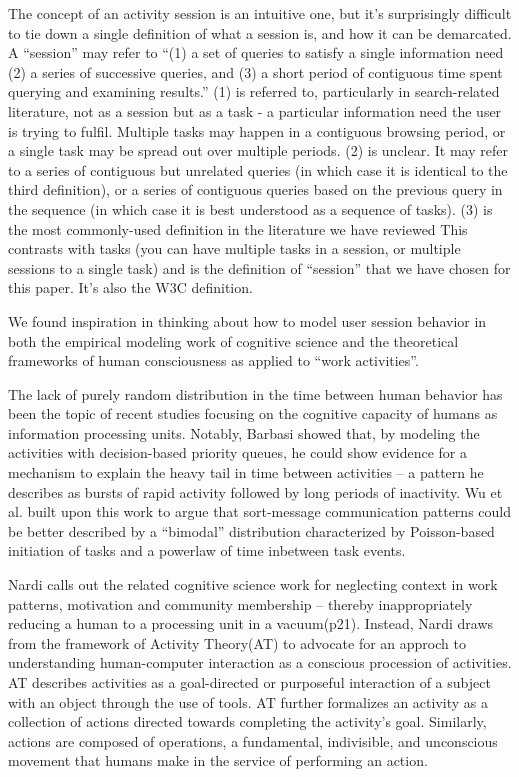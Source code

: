 The concept of an activity session is an intuitive one, but it's surprisingly difficult to tie down a single definition of what a session is, and how it can be demarcated.  A ``session'' may refer to ``(1) a set of queries to satisfy a single information need (2) a series of successive queries, and (3) a short period of contiguous time spent querying and examining results.''\cite{jones2008beyond}
(1) is referred to, particularly in search-related literature,\cite{jones2008beyond, eickhoff2014lessons} not as a session but as a task - a particular information need the user is trying to fulfil.  Multiple tasks may happen in a contiguous browsing period, or a single task may be spread out over multiple periods.
(2) is unclear. It may refer to a series of contiguous but unrelated queries (in which case it is identical to the third definition), or a series of contiguous queries based on the previous query in the sequence (in which case it is best understood as a sequence of tasks).
(3) is the most commonly-used definition in the literature we have reviewed\cite{spiliopoulou2003framework,white2010assessing,govseva2006empirical,nadjarbashi2004improving} This contrasts with tasks (you can have multiple tasks in a session, or multiple sessions to a single task) and is the definition of ``session'' that we have chosen for this paper. It's also the W3C definition.\cite{W3C1999}

We found inspiration in thinking about how to model user session behavior in both the empirical modeling work of cognitive science and the theoretical frameworks of human consciousness as applied to ``work activities''.
 
The lack of purely random distribution in the time between human behavior has been the topic of recent studies focusing on the cognitive capacity of humans as information processing units.  Notably, Barbasi showed that, by modeling the activities with decision-based priority queues, he could show evidence for a mechanism to explain the heavy tail in time between activities\cite{barabasi2005origin} -- a pattern he describes as bursts of rapid activity followed by long periods of inactivity.  Wu et al. built upon this work to argue that sort-message communication patterns could be better described by a ``bimodal'' distribution characterized by Poisson-based initiation of tasks and a powerlaw of time inbetween task events\cite{wu2010evidence}.

Nardi calls out the related cognitive science work for neglecting context in work patterns, motivation and community membership -- thereby inappropriately reducing a human to a processing unit in a vacuum\cite{nardi1996context}(p21).  Instead, Nardi draws from the framework of Activity Theory(AT) to advocate for an approch to understanding human-computer interaction as a conscious procession of activities.  AT describes activities as a goal-directed or purposeful interaction of a subject with an object through the use of tools. AT further formalizes an activity as a collection of actions directed towards completing the activity's goal.  Similarly, actions are composed of operations, a fundamental, indivisible, and unconscious movement that humans make in the service of performing an action.

